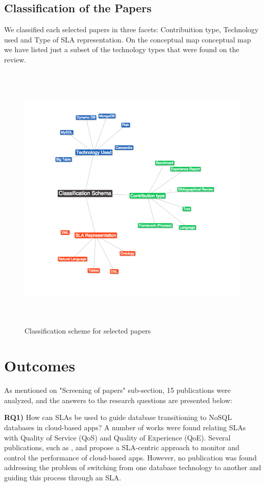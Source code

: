 \documentclass{article}
\begin{document}
\newpage
\subsection{Classification of the Papers}

We classified each selected papers in three facets: Contribuition type, Technology used and Type of SLA representation. On the conceptual map conceptual map we have listed just a subset of the technology types that were found on the review.  

\begin{figure}[!h]
\centering
\includegraphics[height=130mm]{pic2.png}
\caption{Classification scheme for selected papers \label{overflow}}
\end{figure}

\newpage
\section{Outcomes}

As mentioned on "Screening of papers" sub-section, 15 publications were analyzed, and the answers to the research questions are presented below:

\textbf{RQ1)} How can SLAs be used to guide database transitioning to NoSQL databases in cloud-based apps? 
A number of works were found relating SLAs with Quality of Service (QoS) and Quality of Experience (QoE). Several publications, such as \cite{Xiong:2012:DMR:2213598.2213614}, \cite{Konstantinou:2012:TEN:2213836.2213943} and \cite{Klems:2012:RQM:2477172.2477488} propose a SLA-centric approach to monitor and control the performance of cloud-based apps. However, no publication was found addressing the problem of switching from one database technology to another and guiding this process through an SLA. 
\end{document}
